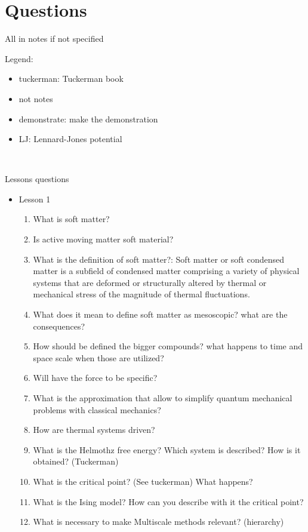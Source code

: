 \chapter{Questions}

All in notes if not specified\\
\small{
Legend:
\begin{itemize}
    \item tuckerman: Tuckerman book
    \item not notes
    \item demonstrate: make the demonstration
    \item LJ: Lennard-Jones potential
\end{itemize}
}
\hfill \\
\small{
Lessons questions
\begin{itemize}
    \item Lesson 1
    \begin{enumerate}
        \item What is soft matter?
        \item Is active moving matter soft material?
        \item What is the definition of soft matter?: Soft matter or soft condensed matter is a subfield of condensed matter comprising a variety of physical systems that are deformed or structurally altered by thermal or mechanical stress of the magnitude of thermal fluctuations.
        \item What does it mean to define soft matter as mesoscopic? what are the consequences?
        \item How should be defined the bigger compounds? what happens to time and space scale when those are utilized?
        \item Will have the force to be specific?
        \item What is the approximation that  allow to simplify quantum mechanical problems with classical mechanics?
        \item How are thermal systems driven?
        \item What is the Helmothz free energy? Which system is described? How is it obtained? (Tuckerman)
        \item What is the critical point? (See tuckerman) What happens?
        \item What is the Ising model? How can you describe with it the critical point?
        \item What is necessary to make Multiscale methods relevant? (hierarchy)

\end{enumerate}
\end{itemize}}

